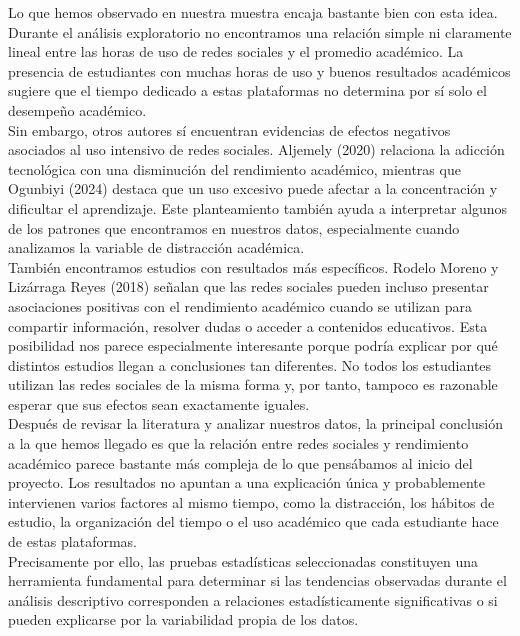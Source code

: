\documentclass[12pt]{article}
\begin{document}
Lo que hemos observado en nuestra muestra encaja bastante bien con esta idea. Durante el análisis exploratorio no encontramos una relación simple ni claramente lineal entre las horas de uso de redes sociales y el promedio académico. La presencia de estudiantes con muchas horas de uso y buenos resultados académicos sugiere que el tiempo dedicado a estas plataformas no determina por sí solo el desempeño académico.
\\
Sin embargo, otros autores sí encuentran evidencias de efectos negativos asociados al uso intensivo de redes sociales. Aljemely (2020) relaciona la adicción tecnológica con una disminución del rendimiento académico, mientras que Ogunbiyi (2024) destaca que un uso excesivo puede afectar a la concentración y dificultar el aprendizaje. Este planteamiento también ayuda a interpretar algunos de los patrones que encontramos en nuestros datos, especialmente cuando analizamos la variable de distracción académica.
\\

También encontramos estudios con resultados más específicos. Rodelo Moreno y Lizárraga Reyes (2018) señalan que las redes sociales pueden incluso presentar asociaciones positivas con el rendimiento académico cuando se utilizan para compartir información, resolver dudas o acceder a contenidos educativos. Esta posibilidad nos parece especialmente interesante porque podría explicar por qué distintos estudios llegan a conclusiones tan diferentes. No todos los estudiantes utilizan las redes sociales de la misma forma y, por tanto, tampoco es razonable esperar que sus efectos sean exactamente iguales.
\\

Después de revisar la literatura y analizar nuestros datos, la principal conclusión a la que hemos llegado es que la relación entre redes sociales y rendimiento académico parece bastante más compleja de lo que pensábamos al inicio del proyecto. Los resultados no apuntan a una explicación única y probablemente intervienen varios factores al mismo tiempo, como la distracción, los hábitos de estudio, la organización del tiempo o el uso académico que cada estudiante hace de estas plataformas.
\\

Precisamente por ello, las pruebas estadísticas seleccionadas constituyen una herramienta fundamental para determinar si las tendencias observadas durante el análisis descriptivo corresponden a relaciones estadísticamente significativas o si pueden explicarse por la variabilidad propia de los datos.\\
\end{document}

